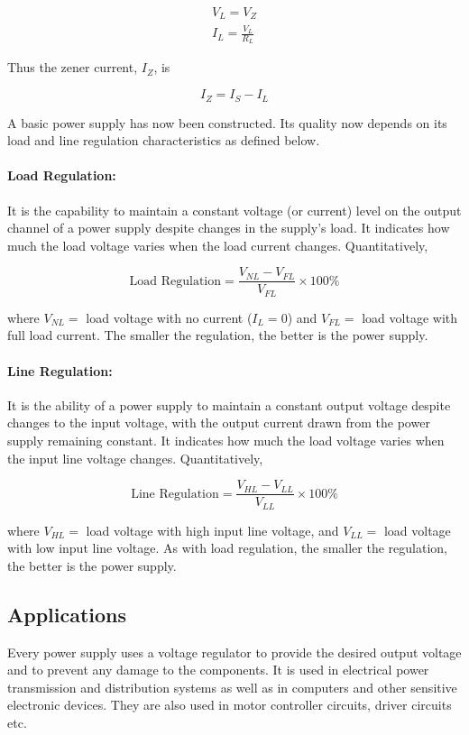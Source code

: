 \begin{align}
    V_L = V_Z\\
    I_L = \frac{V_L}{R_L}
\end{align}

Thus the zener current, $I_Z$, is

\begin{equation}
    I_Z = I_S - I_L
\end{equation}

A basic power supply has now been constructed. Its quality now depends on its load and line regulation characteristics as  defined below.\\

\paragraph*{\textbf{Load Regulation:}} It is the capability to maintain a constant voltage (or current) level on the output channel of a power supply despite changes in the supply's load. It indicates how much the load voltage varies when the load current changes. Quantitatively,

\begin{equation}
    \text{Load Regulation} = \frac{V_{NL}-V_{FL}}{V_{FL}}\times 100\%
\end{equation}

where $V_{NL}=$ load voltage with no current ($I_L = 0$) and $V_{FL}=$  load voltage with full load current. The smaller the regulation, the better is the power supply.\\

\paragraph*{\textbf{Line Regulation:}} It is the ability of a power supply to maintain a constant output voltage despite changes to the input voltage, with the output current drawn from the power supply remaining constant. It indicates how much the load voltage varies when the input line voltage changes. Quantitatively,

\begin{equation}
    \text{Line Regulation} = \frac{V_{HL}-V_{LL}}{V_{LL}}\times 100\%
\end{equation}

where $V_{HL} =$ load voltage with high input line voltage, and $V_{LL} =$ load voltage with low input line voltage. As with load regulation, the smaller the regulation, the better is the power supply.

\subsection*{Applications}
Every power supply uses a voltage regulator to provide the desired output voltage and to prevent any damage to the components. It is used in electrical power transmission and distribution systems as well as in computers and other sensitive electronic devices. They are also used in motor controller circuits, driver circuits etc.